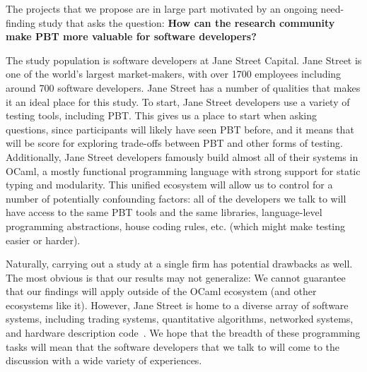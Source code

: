 
\label{sec:motivation}
\iflater{}\fi
The projects that we propose are in large part motivated by an ongoing
need-finding study that asks the question: {\bf How can the research community
make PBT more valuable for software developers?} 

The study population is software developers at Jane Street Capital. Jane Street
is one of the world's largest market-makers, with over 1700 employees including
around 700 software developers. Jane Street has a number of qualities that
makes it an ideal place for this study.
To start, Jane Street developers use
a variety of testing tools, including PBT. This gives us a place to start
when asking questions, since participants will likely have seen PBT before,
and it means that will be score for exploring trade-offs between PBT and
other forms of testing.
Additionally, Jane Street developers famously build almost all of their
systems in OCaml, a mostly functional programming language with strong support
for static typing and modularity. This unified ecosystem
will allow
us to control for a number of potentially confounding factors: all of the
developers we talk to will have access to the same PBT tools and the same
libraries, language-level programming abstractions, house coding rules,
etc. (which might make testing easier or harder).

Naturally, carrying out a study at a single firm has potential drawbacks as
well. The most obvious is that our results may not generalize: We
cannot guarantee that our findings will apply outside of the OCaml ecosystem (and
other ecosystems like it). However, Jane Street is home to a diverse array of
software systems, including trading systems, quantitative
algorithms, networked systems, and hardware description code~\cite{signalsandthreads}.
We hope that the breadth of these programming tasks will mean that the software
developers that we talk to will come to the discussion with a wide variety of
experiences.

